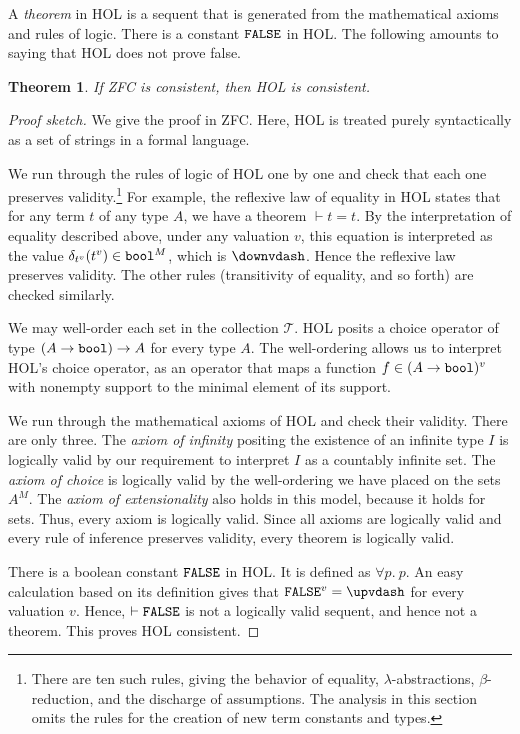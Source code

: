 \documentclass[brochure,english,12pt]{bourbaki}
\theoremstyle{plain}
\newtheorem{theorem}[equation]{Theorem}
\def\op#1{{\operatorname{#1}}}
\def\bool{\op{\tt bool}}
\def\T{{\mathcal T}}
\begin{document}
A {\it theorem} in HOL is a sequent that is generated from the mathematical axioms
and rules of logic.  There is a constant ${\tt FALSE}$ in HOL.  The following amounts to saying that
HOL does not prove false.

\begin{theorem} If ZFC is consistent, then HOL is consistent.
\end{theorem}

\begin{proof}[Proof sketch]
We give the proof in ZFC.  Here, HOL is treated purely syntactically as a set of strings in 
a formal language.


We run through the rules of logic of HOL one by one and check that each one preserves
validity.\footnote{There are ten such rules, giving the behavior of equality, $\lambda$-abstractions, $\beta$-reduction,
and the discharge of assumptions.
The analysis in this section omits the rules for the creation of new  term constants and types.
}
For example, the reflexive law of equality in HOL states that for any term $t$
of any type $A$, we have a theorem $\vdash t = t$.  By the interpretation of equality described above, under
any valuation $v$, this equation is interpreted as the value $\delta_{t^{v}}(t^{v})\in\bool^M$,
 which is $\downvdash $.  Hence the reflexive law preserves validity.
The other rules (transitivity of equality, and so forth) are checked similarly.

We may well-order
 each set in the collection $\T$. 
  HOL posits a choice operator of type $(A\to\bool)\to A$ for every type $A$.  The well-ordering  
allows us to 
interpret HOL's choice operator, as an operator
that maps a function $f\in (A\to\bool)^v$ with nonempty support to
the minimal element of its support.

We run through the mathematical axioms of HOL and check their validity. 
There are only three.  The {\it axiom
of infinity} positing the existence of an infinite type $I$
is logically valid by our requirement to interpret $I$ as a countably infinite set.  The {\it axiom of
choice} is logically valid by the well-ordering we have placed on the sets $A^M$.  The {\it axiom
of extensionality} also holds in this model, because it holds for sets.
Thus, every axiom is logically valid.  
Since all axioms are logically valid and every rule of inference
preserves validity, every theorem is logically valid.

There is a boolean constant $\op{\tt FALSE}$ in HOL. It is defined as $\forall p.~p$.
An easy calculation based on its definition gives that $\op{\tt FALSE}^v = \upvdash$ for every valuation $v$.
Hence, $\vdash \op{\tt FALSE}$ is not a logically valid sequent, and hence not a theorem.
This proves HOL consistent.
\end{proof}
\end{document}
